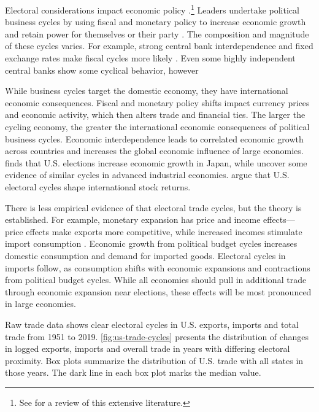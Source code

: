 \documentclass[12pt]{article}
\begin{document}
Electoral considerations impact economic policy \citep{Nordhaus1975}.\footnote{See \citet{Dubois2016} for a review of this extensive literature.} 
Leaders undertake political business cycles by using fiscal and monetary policy to increase economic growth and retain power for themselves or their party \citep{Tufte1978, Rogoff1987}. 
The composition and magnitude of these cycles varies. 
For example, strong central bank interdependence and fixed exchange rates make fiscal cycles more likely \citep{ClarkHallerberg2000}. 
Even some highly independent central banks show some cyclical behavior, however \citep[pg. 247]{Dubois2016}


While business cycles target the domestic economy, they have international economic consequences.
Fiscal and monetary policy shifts impact currency prices and economic activity, which then alters trade and financial ties. 
The larger the cycling economy, the greater the international economic consequences of political business cycles.
Economic interdependence leads to correlated economic growth across countries \citep{ArtisZhang1999, Kayser2006} and increases the global economic influence of large economies. 
\citet{Ito1991} finds that U.S. elections increase economic growth in Japan, while \citet{ThompsonZuk1983} uncover some evidence of similar cycles in advanced industrial economies.
\citet{FoersterSchmitz1997} argue that U.S. electoral cycles shape international stock returns.



There is less empirical evidence of that electoral trade cycles, but the theory is established.
For example, monetary expansion has price and income effects--- price effects make exports more competitive, while increased incomes stimulate import consumption \citep{Sumner2021}.
Economic growth from political budget cycles increases domestic consumption and demand for imported goods. 
Electoral cycles in imports follow, as consumption shifts with economic expansions and contractions from political budget cycles.  
While all economies should pull in additional trade through economic expansion near elections, these effects will be most pronounced in large economies. 


Raw trade data shows clear electoral cycles in U.S. exports, imports and total trade from 1951 to 2019. 
\autoref{fig:us-trade-cycles} presents the distribution of changes in logged exports, imports and overall trade in years with differing electoral proximity.
Box plots summarize the distribution of U.S. trade with all states in those years. 
The dark line in each box plot marks the median value. 
\end{document}
